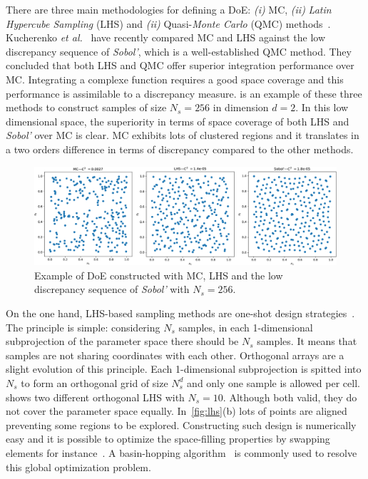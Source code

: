 There are three main methodologies for defining a DoE: \emph{(i)} MC, \emph{(ii)} \emph{Latin Hypercube Sampling} (LHS) and \emph{(ii)} Quasi-\emph{Monte Carlo} (QMC) methods~\citep{Cavazzuti2013,Garud2017}. Kucherenko \emph{et al.}~\citep{Kucherenko2015} have recently compared MC and LHS against the low discrepancy sequence of \emph{Sobol'}, which is a well-established QMC method. They concluded that both LHS and QMC offer superior integration performance over MC. Integrating a complexe function requires a good space coverage and this performance is assimilable to a discrepancy measure.  is an example of these three methods to construct samples of size $N_s = 256$ in dimension $d = 2$. In this low dimensional space, the superiority in terms of space coverage of both LHS and \emph{Sobol'} over MC is clear. MC exhibits lots of clustered regions and it translates in a two orders difference in terms of discrepancy compared to the other methods.

\begin{figure}[!ht]
\centering
\includegraphics[width=\linewidth,keepaspectratio]{fig/literature/doe_examples.pdf}
\caption{Example of DoE constructed with MC, LHS and the low discrepancy sequence of \emph{Sobol'}  with $N_s=256$.}
\label{fig:ex_doe}
\end{figure}

On the one hand, LHS-based sampling methods are one-shot design strategies~\citep{Mckay1979,Fang2006}. The principle is simple: considering $N_s$ samples, in each 1-dimensional subprojection of the parameter space there should be $N_s$ samples. It means that samples are not sharing coordinates with each other. Orthogonal arrays are a slight evolution of this principle. Each 1-dimensional subprojection is spitted into $N_s$ to form an orthogonal grid of size $N_s^d$ and only one sample is allowed per cell.  shows two different orthogonal LHS with $N_s=10$. Although both valid, they do not cover the parameter space equally. In~\cref{fig:lhs}(b) lots of points are aligned preventing some regions to be explored. Constructing such design is numerically easy and it is possible to optimize the space-filling properties by swapping elements for instance~\cite{Fang2006,Damblin2013}. A basin-hopping algorithm~\cite{wales1997} is commonly used to resolve this global optimization problem.

